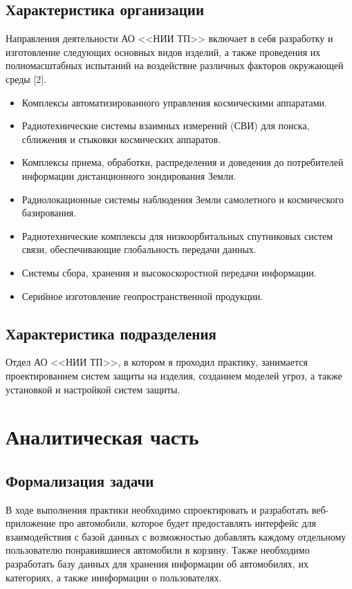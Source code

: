\documentclass[a4paper,14pt, unknownkeysallowed]{extreport}
\begin{document}
\section{Характеристика организации}

Направления деятельности АО <<НИИ ТП>> включает в себя разработку и изготовление следующих основных видов изделий, а также проведения их полномасштабных испытаний на воздействие различных факторов окружающей среды [2].

\begin{itemize}
	\item Комплексы автоматизированного управления космическими аппаратами.
	\item Радиотехнические системы взаимных измерений (СВИ) для поиска, сближения и стыковки космических аппаратов.
 	\item Комплексы приема, обработки, распределения и доведения до потребителей информации дистанционного зондирования Земли.
  	\item Радиолокационные системы наблюдения Земли самолетного и космического базирования.
    \item Радиотехнические комплексы для низкоорбитальных спутниковых систем связи, обеспечивающие глобальность передачи данных.
    \item Системы сбора, хранения и высокоскоростной передачи информации.
    \item Серийное изготовление геопространственной продукции.
\end{itemize}

\section{Характеристика подразделения}

Отдел АО <<НИИ ТП>>, в котором я проходил практику, занимается проектированием систем защиты на изделия, созданием моделей угроз, а также установкой и настройкой систем защиты.

\chapter{Аналитическая часть}

\section{Формализация задачи}

В ходе выполнения практики необходимо спроектировать и разработать веб-приложение про автомобили, которое будет предоставлять интерфейс для взаимодействия с базой данных с возможностью добавлять каждому отдельному пользователю понравившиеся автомобили в корзину. Также необходимо разработать базу данных для хранения информации об автомобилях, их категориях, а также иинформации о пользователях.
\end{document}

